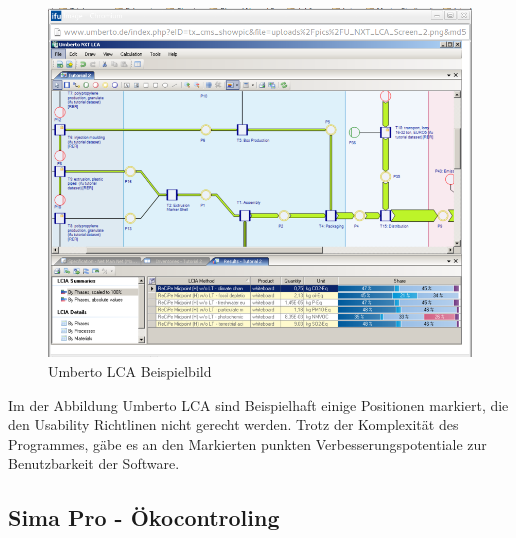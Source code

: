 \documentclass[a4paper, 12pt, twoside, BCOR=20mm, DIV=calc, abstracton, parskip=half*, toc=bibliography, toc=listof, headsepline, footsepline, headings=small, numbers=enddot]{scrreprt}
\begin{document}
%
	\begin{figure}
	\includegraphics[width=\textwidth]{Bild/Umberto_NXT_LCA.png}
		\caption{Umberto LCA Beispielbild} 
	\end{figure}
	
	Im der Abbildung Umberto LCA sind Beispielhaft einige Positionen markiert, die den Usability Richtlinen nicht gerecht werden. 
	Trotz der Komplexität des Programmes, gäbe es an den Markierten punkten Verbesserungspotentiale zur Benutzbarkeit der Software. 
	
\subsection{Sima Pro - Ökocontroling}
\end{document}
